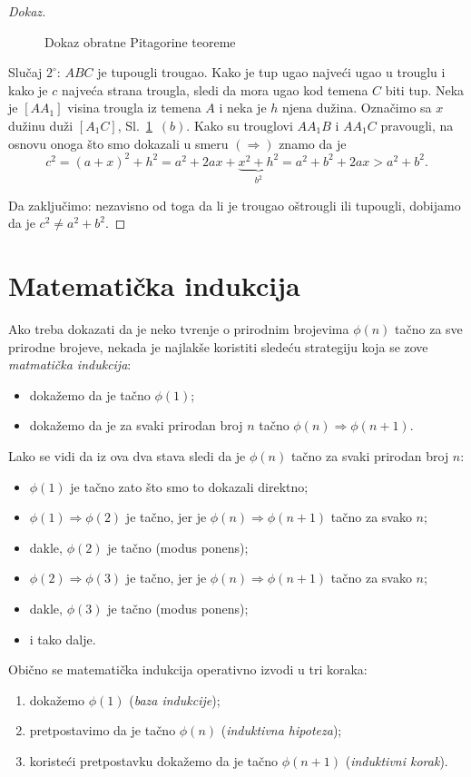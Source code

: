 \begin{proof}[Dokaz]
\begin{figure}
  \centering
  
  \caption{Dokaz obratne Pitagorine teoreme}
  \label{ft05.fig.pitagora2}
\end{figure}

  \medskip

  Slu\v caj $2^\circ$: $ABC$ je tupougli trougao.
  Kako je tup ugao najve\'ci ugao u trouglu i kako je $c$ najve\'ca strana trougla, sledi da mora ugao kod temena $C$ biti tup.
  Neka je $[AA_1]$ visina trougla iz temena $A$ i neka je $h$ njena du\v zina. Ozna\v cimo sa $x$ du\v zinu du\v zi $[A_1C]$,
  Sl.~\ref{ft05.fig.pitagora2}~$(b)$. Kako su trouglovi $AA_1B$ i $AA_1C$ pravougli,
  na osnovu onoga \v sto smo dokazali u smeru $(\Rightarrow)$ znamo da je
  $$
    c^2 = (a + x)^2 + h^2 = a^2 + 2ax + \underbrace{x^2 + h^2}_{b^2} = a^2 + b^2 + 2ax > a^2 + b^2.
  $$
  
  Da zaklju\v cimo: nezavisno od toga da li je trougao o\v strougli ili tupougli, dobijamo da je $c^2 \ne a^2 + b^2$.
\end{proof}

\section{Matemati\v cka indukcija}

Ako treba dokazati da je neko tvr\dj enje o prirodnim brojevima $\phi(n)$ ta\v cno za sve prirodne brojeve, nekada
je najlak\v se koristiti slede\'cu strategiju koja se zove \emph{matmati\v cka indukcija}:
\begin{itemize}
\item doka\v zemo da je ta\v cno $\phi(1)$;
\item doka\v zemo da je za svaki prirodan broj $n$ ta\v cno $\phi(n) \Rightarrow \phi(n+1)$.
\end{itemize}
Lako se vidi da iz ova dva stava sledi da je $\phi(n)$ ta\v cno za svaki prirodan broj $n$:
\begin{itemize}
\item $\phi(1)$ je ta\v cno zato \v sto smo to dokazali direktno;
\item $\phi(1) \Rightarrow \phi(2)$ je ta\v cno, jer je $\phi(n) \Rightarrow \phi(n+1)$ ta\v cno za svako $n$;
\item dakle, $\phi(2)$ je ta\v cno (modus ponens);
\item $\phi(2) \Rightarrow \phi(3)$ je ta\v cno, jer je $\phi(n) \Rightarrow \phi(n+1)$ ta\v cno za svako $n$;
\item dakle, $\phi(3)$ je ta\v cno (modus ponens);
\item i tako dalje.
\end{itemize}
Obi\v cno se matemati\v cka indukcija operativno izvodi u tri koraka:
\begin{enumerate}
\item doka\v zemo $\phi(1)$ (\emph{baza indukcije});
\item pretpostavimo da je ta\v cno $\phi(n)$ (\emph{induktivna hipoteza});
\item koriste\'ci pretpostavku doka\v zemo da je ta\v cno $\phi(n + 1)$ (\emph{induktivni korak}).
\end{enumerate}

